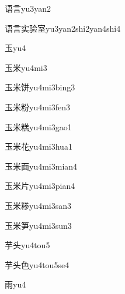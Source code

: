 \begin{verbete}[9;7]{语言}{yu3yan2}
\end{verbete}
\begin{verbete}[9;7;8;10;9]{语言实验室}{yu3yan2shi2yan4shi4}
\end{verbete}
\begin{verbete}[5]{玉}{yu4}
\end{verbete}
\begin{verbete}[5;6]{玉米}{yu4mi3}
\end{verbete}
\begin{verbete}[5;6;9]{玉米饼}{yu4mi3bing3}
\end{verbete}
\begin{verbete}[5;6;10]{玉米粉}{yu4mi3fen3}
\end{verbete}
\begin{verbete}[5;6;16]{玉米糕}{yu4mi3gao1}
\end{verbete}
\begin{verbete}[5;6;7]{玉米花}{yu4mi3hua1}
\end{verbete}
\begin{verbete}[5;6;9]{玉米面}{yu4mi3mian4}
\end{verbete}
\begin{verbete}[5;6;4]{玉米片}{yu4mi3pian4}
\end{verbete}
\begin{verbete}[5;6;14]{玉米糁}{yu4mi3san3}
\end{verbete}
\begin{verbete}[5;6;10]{玉米笋}{yu4mi3sun3}
\end{verbete}
\begin{verbete}[6;5]{芋头}{yu4tou5}
\end{verbete}
\begin{verbete}[6;5;6]{芋头色}{yu4tou5se4}
\end{verbete}
\begin{verbete}[8]{雨}{yu4}
\end{verbete}

